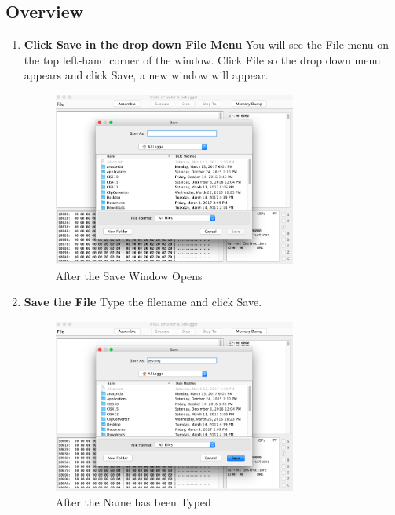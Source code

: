 \documentclass[a3paper, 11pt]{article}
\newlength{\drop}
\begin{document}
\subsection{Overview}
\begin{enumerate}
	\item \textbf{Click Save in the drop down File Menu}
	You will see the File menu on the top left-hand corner of the window. Click File so the drop down menu appears and click Save, a new window will appear. 
	\begin{figure}[h!]
		\centering
		\includegraphics[width=8cm, height=5.74cm]{Save}
		\caption{After the Save Window Opens}
	\end{figure}
	\item \textbf{Save the File}
	Type the filename and click Save.
	\begin{figure}[h!]
		\centering
		\includegraphics[width=8cm, height=5.74cm]{SaveText}
		\caption{After the Name has been Typed}
	\end{figure}
\end{enumerate}
\end{document}
